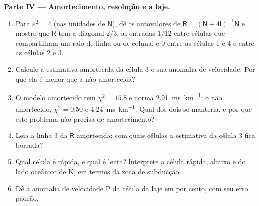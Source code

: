 \begin{problem}
\noindent\textbf{Parte IV --- Amortecimento, resolução e a laje.}
\begin{enumerate}[resume]
  \item Para $\varepsilon^2 = 4$ (nas unidades de $\mathsf N$), dê os
        autovalores de $\mathsf R = (\mathsf N + 4\mathsf I)^{-1}\mathsf N$ e
        mostre que $\mathsf R$ tem a diagonal $2/3$, as entradas $1/12$
        entre células que compartilham um raio de linha ou de coluna, e $0$ entre as células 1
        e 4 e entre as células 2 e 3.
  \item Calcule a estimativa amortecida da célula 3 e sua anomalia de velocidade. Por que ela é
        menor que a não amortecida?
  \item O modelo amortecido tem $\chi^2 = 15.8$ e norma \qty{2.91}{ms.km^{-1}};
        o não amortecido, $\chi^2 = 0.50$ e \qty{4.24}{ms.km^{-1}}. Qual dos dois se
        manteria, e por que este problema não precisa de amortecimento?
  \item Leia a linha 3 da $\mathsf R$ amortecida: com quais células a estimativa
        da célula 3 fica borrada?
  \item Qual célula é rápida, e qual é lenta? Interprete a célula rápida, abaixo e
        do lado oceânico de K, em termos da zona de subducção.
  \item Dê a anomalia de velocidade P da célula da laje em por cento, com seu
        erro padrão.
\end{enumerate}
\end{problem}
